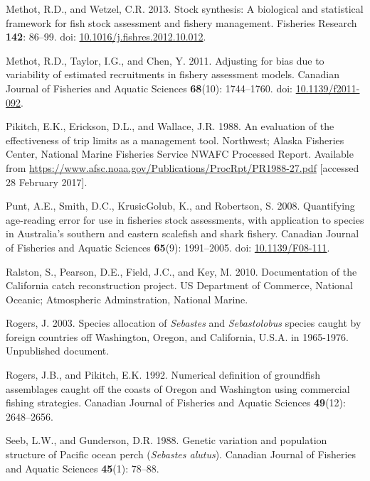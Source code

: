 \documentclass[12pt,]{article}
\begin{document}
\hypertarget{ref-methot_stock_2013}{}
Methot, R.D., and Wetzel, C.R. 2013. Stock synthesis: A biological and
statistical framework for fish stock assessment and fishery management.
Fisheries Research \textbf{142}: 86--99. doi:
\href{https://doi.org/10.1016/j.fishres.2012.10.012}{10.1016/j.fishres.2012.10.012}.

\hypertarget{ref-methot_adjusting_2011}{}
Methot, R.D., Taylor, I.G., and Chen, Y. 2011. Adjusting for bias due to
variability of estimated recruitments in fishery assessment models.
Canadian Journal of Fisheries and Aquatic Sciences \textbf{68}(10):
1744--1760. doi:
\href{https://doi.org/10.1139/f2011-092}{10.1139/f2011-092}.

\hypertarget{ref-pikitch_evaluation_1988}{}
Pikitch, E.K., Erickson, D.L., and Wallace, J.R. 1988. An evaluation of
the effectiveness of trip limits as a management tool. Northwest; Alaska
Fisheries Center, National Marine Fisheries Service NWAFC Processed
Report. Available from
\url{https://www.afsc.noaa.gov/Publications/ProcRpt/PR1988-27.pdf}
{[}accessed 28 February 2017{]}.

\hypertarget{ref-punt_quantifying_2008}{}
Punt, A.E., Smith, D.C., KrusicGolub, K., and Robertson, S. 2008.
Quantifying age-reading error for use in fisheries stock assessments,
with application to species in Australia's southern and eastern
scalefish and shark fishery. Canadian Journal of Fisheries and Aquatic
Sciences \textbf{65}(9): 1991--2005. doi:
\href{https://doi.org/10.1139/F08-111}{10.1139/F08-111}.

\hypertarget{ref-ralston_documentation_2010}{}
Ralston, S., Pearson, D.E., Field, J.C., and Key, M. 2010. Documentation
of the California catch reconstruction project. US Department of
Commerce, National Oceanic; Atmospheric Adminstration, National Marine.

\hypertarget{ref-rogers_species_2003}{}
Rogers, J. 2003. Species allocation of \emph{Sebastes} and
\emph{Sebastolobus} species caught by foreign countries off Washington,
Oregon, and California, U.S.A. in 1965-1976. Unpublished document.

\hypertarget{ref-rogers_numerical_1992}{}
Rogers, J.B., and Pikitch, E.K. 1992. Numerical definition of groundfish
assemblages caught off the coasts of Oregon and Washington using
commercial fishing strategies. Canadian Journal of Fisheries and Aquatic
Sciences \textbf{49}(12): 2648--2656.

\hypertarget{ref-seeb_genetic_1988}{}
Seeb, L.W., and Gunderson, D.R. 1988. Genetic variation and population
structure of Pacific ocean perch (\emph{Sebastes alutus}). Canadian
Journal of Fisheries and Aquatic Sciences \textbf{45}(1): 78--88.
\end{document}
